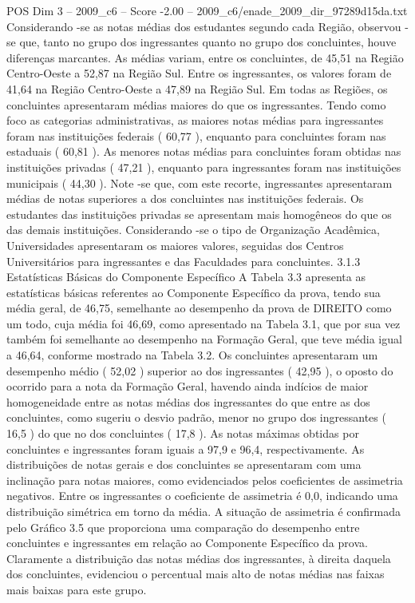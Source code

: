 \begin{textsample}{POS Dim 3 – 2009\_c6 – Score -2.00 – 2009\_c6/enade\_2009\_dir\_97289d15da.txt}
Considerando -se as notas médias dos estudantes segundo cada Região, observou -se que, tanto no grupo dos ingressantes quanto no grupo dos concluintes, houve diferenças marcantes.
As médias variam, entre os concluintes, de 45,51 na Região Centro-Oeste a 52,87 na Região Sul.
Entre os ingressantes, os valores foram de 41,64 na Região Centro-Oeste a 47,89 na Região Sul.
Em todas as Regiões, os concluintes apresentaram médias maiores do que os ingressantes.
Tendo como foco as categorias administrativas, as maiores notas médias para ingressantes foram nas instituições federais ( 60,77 ), enquanto para concluintes foram nas estaduais ( 60,81 ).
As menores notas médias para concluintes foram obtidas nas instituições privadas ( 47,21 ), enquanto para ingressantes foram nas instituições municipais ( 44,30 ).
Note -se que, com este recorte, ingressantes apresentaram médias de notas superiores a dos concluintes nas instituições federais.
Os estudantes das instituições privadas se apresentam mais homogêneos do que os das demais instituições.
Considerando -se o tipo de Organização Acadêmica, Universidades apresentaram os maiores valores, seguidas dos Centros Universitários para ingressantes e das Faculdades para concluintes. 3.1.3 Estatísticas Básicas do Componente Específico A Tabela 3.3 apresenta as estatísticas básicas referentes ao Componente Específico da prova, tendo sua média geral, de 46,75, semelhante ao desempenho da prova de DIREITO como um todo, cuja média foi 46,69, como apresentado na Tabela 3.1, que por sua vez também foi semelhante ao desempenho na Formação Geral, que teve média igual a 46,64, conforme mostrado na Tabela 3.2.
Os concluintes apresentaram um desempenho médio ( 52,02 ) superior ao dos ingressantes ( 42,95 ), o oposto do ocorrido para a nota da Formação Geral, havendo ainda indícios de maior homogeneidade entre as notas médias dos ingressantes do que entre as dos concluintes, como sugeriu o desvio padrão, menor no grupo dos ingressantes ( 16,5 ) do que no dos concluintes ( 17,8 ).
As notas máximas obtidas por concluintes e ingressantes foram iguais a 97,9 e 96,4, respectivamente.
As distribuições de notas gerais e dos concluintes se apresentaram com uma inclinação para notas maiores, como evidenciados pelos coeficientes de assimetria negativos.
Entre os ingressantes o coeficiente de assimetria é 0,0, indicando uma distribuição simétrica em torno da média.
A situação de assimetria é confirmada pelo Gráfico 3.5 que proporciona uma comparação do desempenho entre concluintes e ingressantes em relação ao Componente Específico da prova.
Claramente a distribuição das notas médias dos ingressantes, à direita daquela dos concluintes, evidenciou o percentual mais alto de notas médias nas faixas mais baixas para este grupo.

\end{textsample}
